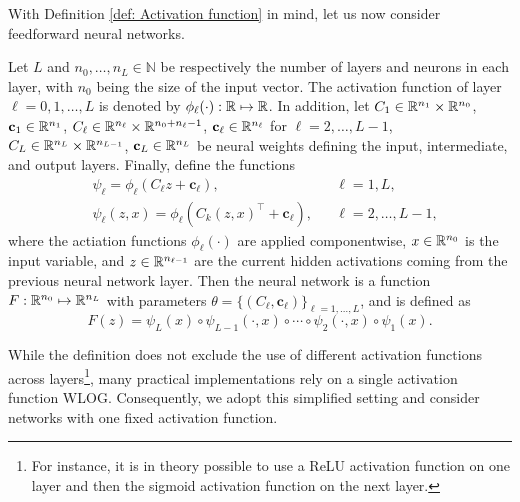 With Definition \ref{def: Activation function} in mind, let us now consider feedforward neural networks. 
\begin{definition}
\label{def: Feedforward neural networks}
    Let $L$ and $n_0, \ldots, n_L \in \mathbb N$ be respectively the number of layers and neurons in each layer, with $n_0$ being the size of the input vector. The activation function of layer $\ell = 0,1, \ldots, L$ is denoted by $\phi_\ell (\cdot): \mathbb{R} \mapsto \mathbb{R}$. In addition, let $C_1 \in \mathbb{R}^{n_1} \times \mathbb{R}^{n_0}$, $\mathbf{c}_1 \in \mathbb{R}^{n_1}$, $C_\ell \in \mathbb{R}^{n_\ell} \times \mathbb{R}^{n_0+n_\ell-1}$, $\mathbf{c}_\ell \in \mathbb{R}^{n_\ell}$ for $\ell = 2, \ldots, L-1$, $C_L \in \mathbb{R}^{n_L} \times \mathbb{R}^{n_{L-1}}$, $\mathbf{c}_L \in \mathbb{R}^{n_L}$ be neural weights defining the input, intermediate, and output layers. Finally, define the functions
    \begin{align*}
        & \psi_\ell = \phi_\ell(C_\ell z + \mathbf{c}_\ell), && \ell = 1,L, \\
        & \psi_\ell(z, x) = \phi_\ell (C_k (z, x)^\top  + \mathbf{c}_\ell), && \ell = 2, \ldots, L-1,
    \end{align*}
    where the actiation functions $\phi_\ell(\cdot)$ are applied componentwise, $x \in \mathbb{R}^{n_0}$ is the input variable, and $z \in \mathbb{R}^{n_{\ell-1}}$ are the current hidden activations coming from the previous neural network layer. Then the neural network is a function $F: \mathbb{R}^{n_0} \mapsto \mathbb{R}^{n_L}$ with parameters $\theta=\{(C_\ell,\mathbf{c}_\ell)\}_{\ell = 1, \ldots, L}$, and is defined as 
    \begin{equation*}
        F(z) = \psi_L(x) \circ \psi_{L-1} (\cdot, x) \circ \cdots \circ \psi_2(\cdot, x) \circ \psi_1(x).
    \end{equation*}
\end{definition}
\begin{remark}
    While the definition does not exclude the use of different activation functions across layers\footnote{For instance, it is in theory possible to use a ReLU activation function on one layer and then the sigmoid activation function on the next layer.}, many practical implementations rely on a single activation function WLOG. Consequently, we adopt this simplified setting and consider networks with one fixed activation function.
\end{remark}

